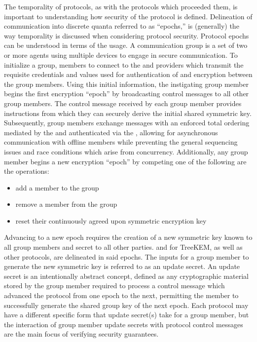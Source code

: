 The temporality of  protocols, as with the  protocols which proceeded them, is important to understanding how security of the protocol is defined.
Delineation of communication into discrete quanta referred to as ``epochs,'' is (generally) the way temporality is discussed when considering protocol security.
Protocol epochs can be understood in terms of the  usage.
A communication group is a set of two or more agents using multiple devices to engage in secure communication.
To initialize a group, members to connect to the  and  providers which transmit the requisite credentials and values used for authentication of and encryption between the group members.
Using this initial information, the instigating group member begins the first encryption ``epoch'' by broadcasting control messages to all other group members.
The control message received by each group member provides instructions from which they can securely derive the initial shared symmetric key.
Subsequently, group members exchange messages with an enforced total ordering \autocite{halmos1960naive} mediated by the  and authenticated via the , allowing for asynchronous communication with offline members while preventing the general sequencing issues and race conditions which arise from concurrency.
Additionally, any group member begins a new encryption ``epoch'' by competing one of the following are the operations:

\begin{itemize}
  \item add a member to the group
  \item remove a member from the group
  \item reset their continuously agreed upon symmetric encryption key
  \end{itemize}

Advancing to a new epoch requires the creation of a new symmetric key known to all group members and secret to all other parties.
 and  for TreeKEM, as well as other  protocols, are delineated in said epochs.
The inputs for a group member to generate the new symmetric key is referred to as an update secret.
An update secret is an intentionally abstract concept, defined as any cryptographic material stored by the group member required to process a control message which advanced the protocol from one epoch to the next, permitting the member to successfully generate the shared group key of the next epoch.
Each protocol may have a different specific form that update secret(s) take for a group member, but the interaction of group member update secrets with protocol control messages are the main focus of verifying security guarantees.


